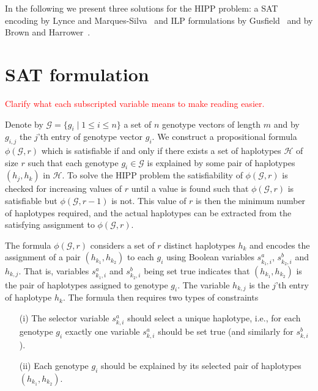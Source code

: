 \documentclass[12pt,a4paper]{article}
\newcommand{\TODO}[1]{\textcolor{red}{#1}}
\begin{document}
In the following we present three solutions for the HIPP problem: a SAT encoding by Lynce and Marques-Silva~\cite{DBLP:conf/aaai/LynceM06} and ILP formulations by Gusfield~\cite{DBLP:conf/cpm/Gusfield03} and by Brown and Harrower~\cite{DBLP:journals/tcbb/BrownH06}.

\section{SAT formulation}
\label{sec:hipp-sat}
\TODO{Clarify what each subscripted variable means to make reading easier.}

Denote by $\mathcal{G}=\{g_i\mid 1\leq i \leq n\}$ a set of $n$ genotype vectors of length $m$ and by $g_{i,j}$ the $j$'th entry of genotype vector $g_i$.
We construct a propositional formula $\phi (\mathcal{G}, r)$ which is satisfiable if and only if there exists a set of haplotypes $\mathcal{H}$ of size $r$ such that each genotype $g_i\in \mathcal{G}$ is explained by some pair of haplotypes $(h_j, h_k)$ in $\mathcal{H}$.
To solve the HIPP problem the satisfiability of $\phi (\mathcal{G}, r)$ is checked for increasing values of $r$ until a value is found such that $\phi (\mathcal{G}, r)$ is satisfiable but $\phi (\mathcal{G}, r-1)$ is not.
This value of $r$ is then the minimum number of haplotypes required, and the actual haplotypes can be extracted from the satisfying assignment to $\phi (\mathcal{G}, r)$.

The formula $\phi (\mathcal{G}, r)$ considers a set of $r$ distinct haplotypes $h_k$ and encodes the assignment of a pair $(h_{k_1}, h_{k_2})$ to each $g_i$ using Boolean variables $s^a_{k_1,i}$, $s^b_{k_2,i}$ and $h_{k,j}$.
That is, variables $s^a_{k_1,i}$ and $s^b_{k_2,i}$ being set true indicates that $(h_{k_1}, h_{k_2})$ is the pair of haplotypes assigned to genotype $g_i$.
The variable $h_{k,j}$ is the $j$'th entry of haplotype $h_k$.
The formula then requires two types of constraints
\begin{enumerate}
\item[(i)] The selector variable $s^a_{k,i}$ should select a unique haplotype, i.e., for each genotype $g_i$ exactly one variable $s^a_{k,i}$ should be set true (and similarly for $s^b_{k,i}$). 
\item[(ii)] Each genotype $g_i$ should be explained by its selected pair of haplotypes $(h_{k_1}, h_{k_2})$. 
\end{enumerate}
\end{document}

